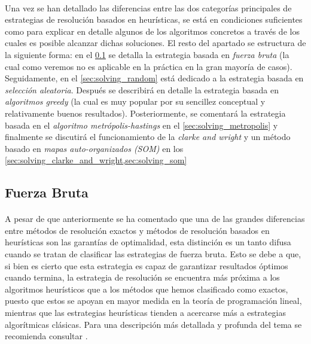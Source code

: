 \documentclass{subfiles}
\begin{document}
      \paragraph{}
      Una vez se han detallado las diferencias entre las dos categorías principales de estrategias de resolución basados en heurísticas, se está en condiciones suficientes como para explicar en detalle algunos de los algoritmos concretos a través de los cuales es posible alcanzar dichas soluciones. El resto del apartado se estructura de la siguiente forma: en el \cref{sec:solving_brute_force} se detalla la estrategia basada en \emph{fuerza bruta} (la cual como veremos no es aplicable en la práctica en la gran mayoría de casos). Seguidamente, en el \cref{sec:solving_random} está dedicado a la estrategia basada en \emph{selección aleatoria}. Después se describirá en detalle la estrategia basada en \emph{algoritmos greedy} (la cual es muy popular por su sencillez conceptual y relativamente buenos resultados). Posteriormente, se comentará la estrategia basada en el \emph{algoritmo metrópolis-hastings} en el \cref{sec:solving_metropolis} y finalmente se discutirá el funcionamiento de la \emph{clarke and wright} y un método basado en \emph{mapas auto-organizados (SOM)} en los \cref{sec:solving_clarke_and_wright,sec:solving_som} 

      \subsection{Fuerza Bruta}
      \label{sec:solving_brute_force}
        
        \paragraph{}
        A pesar de que anteriormente se ha comentado que una de las grandes diferencias entre métodos de resolución exactos y métodos de resolución basados en heurísticas son las garantías de optimalidad, esta distinción es un tanto difusa cuando se tratan de clasificar las estrategias de fuerza bruta. Esto se debe a que, si bien es cierto que esta estrategia es capaz de garantizar resultados óptimos cuando termina, la estrategia de resolución se encuentra más próxima a los algoritmos heurísticos que a los métodos que hemos clasificado como exactos, puesto que estos se apoyan en mayor medida en la teoría de programación lineal, mientras que las estrategias heurísticas tienden a acercarse más a estrategias algorítmicas clásicas. Para una descripción más detallada y profunda del tema se recomienda consultar \cite{cormen2009introduction}.
\end{document}
